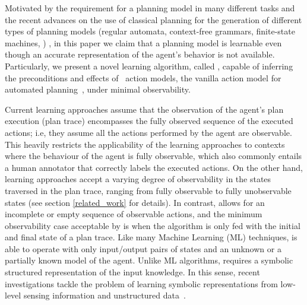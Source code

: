 \textcolor[rgb]{1.00,0.00,0.00}{Motivated by the requirement for a planning model in many different tasks and the recent advances on the use of classical planning for the generation of different types of planning models (regular automata, context-free grammars, finite-state machines, \strips)} \cite{bonet2009automatic,segovia2016generalized,segovia2016hierarchical,segovia2017generating}, in this paper we claim that a planning model is learnable even though an accurate representation of the agent's behavior is not available. Particularly, we present a novel learning algorithm, called \FAMA, capable of inferring the preconditions and effects of \strips\ action models, the vanilla action model for automated planning~\cite{fikes1971strips}, under minimal observability.



\textcolor[rgb]{1.00,0.00,0.00}{Current learning approaches assume that the observation of the agent's plan execution (plan trace) encompasses the fully observed sequence of the executed actions; i.e, they assume all the actions performed by the agent are observable. This heavily restricts the applicability of the learning approaches to contexts where the behaviour of the agent is fully observable, which also commonly entails a human annotator that correctly labels the executed actions. On the other hand, learning approaches accept a varying degree of observability in the states traversed in the plan trace, ranging from fully observable to fully unobservable states (see section \ref{related_work} for details).} In contrast, \FAMA allows for an incomplete or empty sequence of observable actions, and the minimum observability case acceptable by \FAMA is when the algorithm is only fed with the initial and final state of a plan trace. Like many Machine Learning (ML) techniques, \FAMA is able to operate with only input/output pairs of states and an unknown or a partially known model of the agent. Unlike ML algorithms, \FAMA requires a symbolic structured representation of the input knowledge. In this sense, recent investigations tackle the problem of learning symbolic representations from low-level sensing information and unstructured data~\cite{KonidarisKL18,AsaiF18}.

